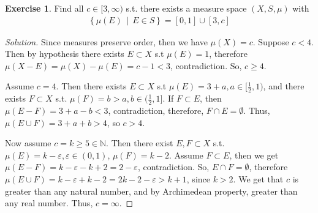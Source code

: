 \documentclass[letterpaper, 12pt, english]{article}
\theoremstyle{definition}
\theoremstyle{definition}
\newtheorem{problem}{Exercise}
\theoremstyle{definition}
\newenvironment{sol}{\begin{proof}[Solution]}{\end{proof}}
\theoremstyle{plain} %
\theoremstyle{plain} %
\theoremstyle{plain} %
\theoremstyle{plain} %
\theoremstyle{remark}
\begin{document}
\setcounter{problem}{5}
\begin{problem}
Find all $ c \in [3, \infty) $ s.t. there exists a measure space $ (X, S, \mu) $ with
\begin{gather*}
    \left\{ \mu(E) \,\middle|\, E \in S \right\} = [0,1] \cup [3, c]
\end{gather*}
\begin{sol}
    Since measures preserve order, then we have $ \mu(X) = c $. 
    Suppose $ c < 4 $. Then by hypothesis there exists $ E \subset X $ 
    s.t $ \mu(E) = 1 $, therefore $ \mu(X - E) = \mu(X) - \mu(E) = c - 1 < 3 $,
    contradiction. So, $ c \geq 4 $.

    Assume $ c= 4 $. Then 
    there exists $ E \subset X $ s.t $ \mu(E) = 3 + a, a \in [\frac{1}{2}, 1) $,
    and there exists $ F \subset X $ s.t. $ \mu(F) = b > a, b \in (\frac{1}{2}, 1] $.
    If $ F \subset E $, then $ \mu(E - F) = 3 + a - b < 3 $, contradiction,
    therefore, $ F \cap E = \emptyset $. Thus, $ \mu(E \cup F) = 3 + a+ b > 4 $, so
    $ c > 4 $.

    Now assume $ c = k \geq 5 \in \mathbb{N}$. Then there exist $ E, F \subset X $ s.t.
    $ \mu(E) = k - \varepsilon, \varepsilon \in (0,1) $, $ \mu(F) = k -2 $.
    Assume $ F \subset E $, then we get
    $ \mu(E - F) = k - \varepsilon - k + 2 = 2 - \varepsilon $, contradiction. So,
    $ E \cap F = \emptyset $, therefore
    $ \mu(E \cup F) = k - \varepsilon + k - 2 = 2k - 2 -\varepsilon > k + 1 $, since 
    $ k > 2 $. We get that $ c $ is greater than any natural number, and by Archimedean 
    property, greater than any real number. Thus, $ c = \infty $.
\end{sol}
\end{problem}
\end{document}
